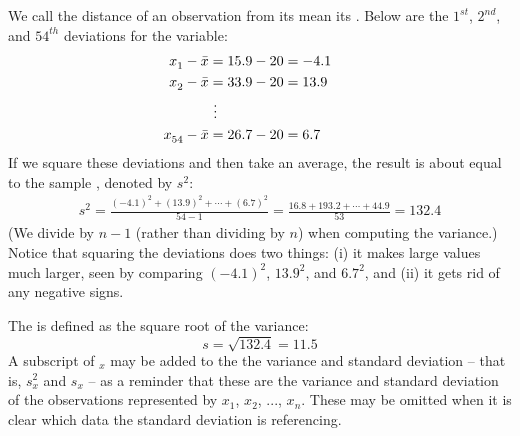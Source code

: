 We call the distance of an observation from its mean its . Below are the $1^{st}_{}$, $2^{nd}_{}$, and $54^{th}_{}$ deviations for the  variable:
\begin{align*}
x_1^{}-\bar{x} &= 15.9-20 = -4.1 \hspace{5mm}\text{ } \\
x_2^{}-\bar{x} &= 33.9-20 = 13.9 \\
			&\ \vdots \\
x_{54}^{}-\bar{x} &= 26.7-20 = 6.7
\end{align*}
If we square these deviations and then take an average, the result is about equal to the sample \label{varianceIsDefined}, denoted by $s_{}^2$:
\begin{eqnarray*}
s_{}^2 = \frac{(-4.1)_{}^2 + (13.9)_{}^2 + \cdots + (6.7)_{}^2}{54-1} = \frac{16.8 + 193.2 + \cdots + 44.9}{53} = 132.4
\end{eqnarray*}
(We divide by $n-1$ (rather than dividing by $n$) when computing the variance.) %
Notice that squaring the deviations does two things: (i) it makes large values much larger, seen by comparing $(-4.1)^2$, $13.9^2$, and $6.7^2$, and (ii) it gets rid of any negative signs.

The  is defined as the square root of the variance:
$$s=\sqrt{132.4} = 11.5$$
A subscript of $_x$ may be added to the the variance and standard deviation -- that is, $s_x^2$ and $s_x^{}$ -- as a reminder that these are the variance and standard deviation of the observations represented by $x_1^{}$, $x_2^{}$, ..., $x_n^{}$. These may be omitted when it is clear which data the standard deviation is referencing.


